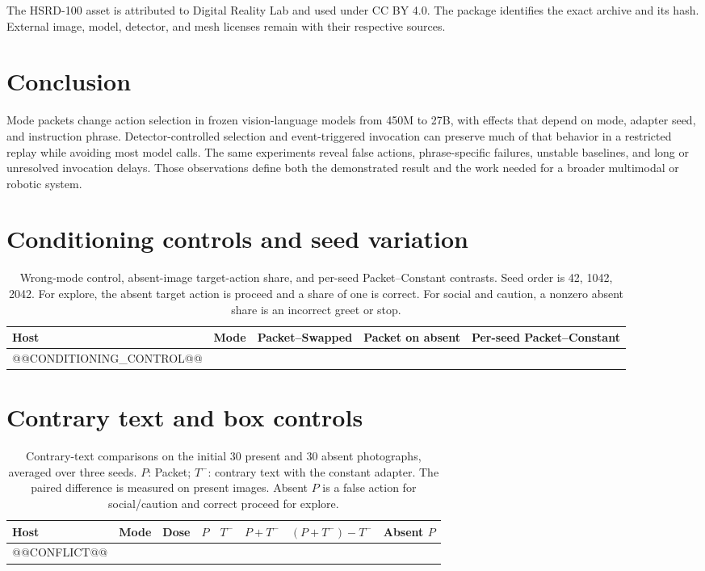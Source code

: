 \documentclass[10pt]{article}
\begin{document}
The HSRD-100 asset is attributed to Digital Reality Lab and
used under CC BY 4.0. The package identifies the exact archive
and its hash. External image, model, detector, and mesh
licenses remain with their respective sources.

\section{Conclusion}
Mode packets change action selection in frozen vision-language
models from 450M to 27B, with effects that depend on mode,
adapter seed, and instruction phrase. Detector-controlled
selection and event-triggered invocation can preserve much
of that behavior in a restricted replay while avoiding most
model calls. The same experiments reveal false actions,
phrase-specific failures, unstable baselines, and long or
unresolved invocation delays. Those observations define both
the demonstrated result and the work needed for a broader
multimodal or robotic system.

\FloatBarrier


\clearpage
\appendix
\section{Conditioning controls and seed variation}
\begin{table}[htbp]\centering\small
\caption{Wrong-mode control, absent-image target-action share, and
per-seed Packet--Constant contrasts. Seed order is 42, 1042, 2042.
For explore, the absent target action is proceed and a share of one
is correct. For social and caution, a nonzero absent share is an
incorrect greet or stop.}\label{tab:controls}
\begin{tabular}{lllll}\toprule
Host & Mode & Packet--Swapped & Packet on absent & Per-seed Packet--Constant\\\midrule
@@CONDITIONING_CONTROL@@
\bottomrule\end{tabular}
\end{table}

\section{Contrary text and box controls}
\begin{table}[htbp]\centering\footnotesize
\caption{Contrary-text comparisons on the initial 30 present and
30 absent photographs, averaged over three seeds. $P$: Packet;
$T^-$: contrary text with the constant adapter. The paired
difference is measured on present images. Absent $P$ is a
false action for social/caution and correct proceed for explore.}
\label{tab:conflict}
\begin{tabular}{lllrrrlr}\toprule
Host & Mode & Dose & $P$ & $T^-$ & $P+T^-$ &
$(P+T^-)-T^-$ & Absent $P$\\\midrule
@@CONFLICT@@
\bottomrule\end{tabular}
\end{table}
\end{document}

